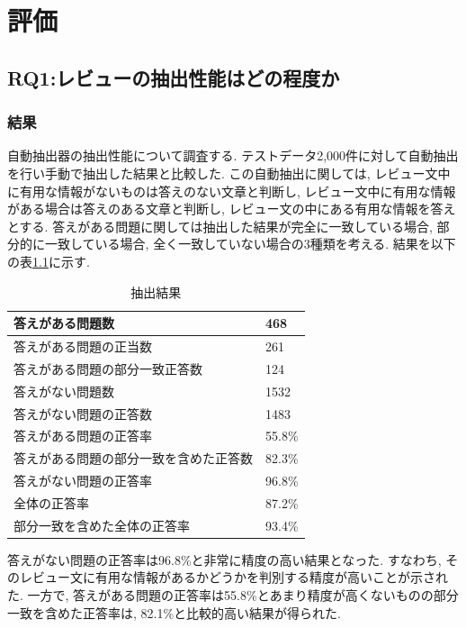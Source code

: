\chapter{評価}
\label{chap:kekkahyouka}

\section{RQ1:レビューの抽出性能はどの程度か}
\subsection{結果}
自動抽出器の抽出性能について調査する. テストデータ2,000件に対して自動抽出を行い手動で抽出した結果と比較した. この自動抽出に関しては, レビュー文中に有用な情報がないものは答えのない文章と判断し, レビュー文中に有用な情報がある場合は答えのある文章と判断し, レビュー文の中にある有用な情報を答えとする. 
答えがある問題に関しては抽出した結果が完全に一致している場合, 部分的に一致している場合, 全く一致していない場合の3種類を考える. 
結果を以下の表\ref{tb:qa}に示す. 

\begin{table}[htbp]
  \caption{抽出結果}
  \label{tb:qa}
  \begin{center}
  \begin{tabularx}{\linewidth}{|X|X|}
    \hline
    答えがある問題数&468\\\hline
    答えがある問題の正当数&261\\\hline
    答えがある問題の部分一致正答数&124\\\hline
    答えがない問題数&1532\\\hline
    答えがない問題の正答数&1483\\\hline
    \hline
    答えがある問題の正答率&55.8\%\\\hline
    答えがある問題の部分一致を含めた正答数&82.3\%\\\hline
    答えがない問題の正答率&96.8\%\\\hline
    \hline
    全体の正答率&87.2\%\\\hline
    部分一致を含めた全体の正答率&93.4\%\\\hline
  \end{tabularx}\end{center}
\end{table}

答えがない問題の正答率は96.8\%と非常に精度の高い結果となった. すなわち, そのレビュー文に有用な情報があるかどうかを判別する精度が高いことが示された. 
一方で, 答えがある問題の正答率は55.8\%とあまり精度が高くないものの部分一致を含めた正答率は, 82.1\%と比較的高い結果が得られた. 

